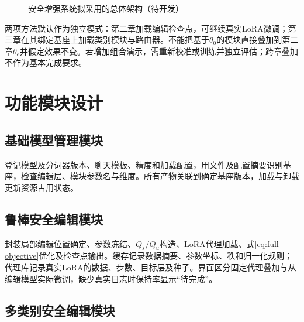 \begin{figure}[htbp]
 \centering
 \caption{安全增强系统拟采用的总体架构（待开发）}
 \label{fig:system-architecture}
\end{figure}

两项方法默认作为独立模式：第二章加载编辑检查点，可继续真实LoRA微调；第三章在其绑定基座上加载类别模块与路由器。不能把基于$\theta_0$的模块直接叠加到第二章$\theta_e$并假定效果不变。若增加组合演示，需重新校准或训练并独立评估；跨章叠加不作为基本完成要求。

\section{功能模块设计}
\subsection{基础模型管理模块}

登记模型及分词器版本、聊天模板、精度和加载配置，用文件及配置摘要识别基座，检查编辑层、模块参数名与维度。所有产物关联到确定基座版本，加载与卸载更新资源占用状态。

\subsection{鲁棒安全编辑模块}

封装局部编辑位置确定、参数冻结、$Q_s/Q_u$构造、LoRA代理加载、式\eqref{eq:full-objective}优化及检查点输出。缓存记录数据摘要、参数坐标、秩和归一化规则；代理库记录真实LoRA的数据、步数、目标层及种子。界面区分固定代理叠加与从编辑模型实际微调，缺少真实日志时保持率显示“待完成”。

\subsection{多类别安全编辑模块}

